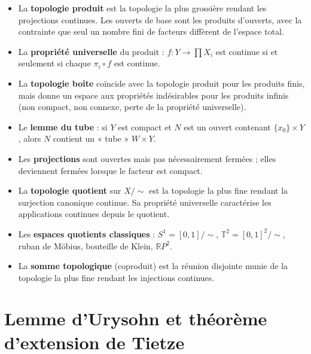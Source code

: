 \documentclass[12pt,a4paper,openany]{book}
\theoremstyle{definition}
\theoremstyle{cours}
\theoremstyle{coursnormal}
\begin{document}
\begin{itemize}
  \item La \textbf{topologie produit} est la topologie la plus grossière rendant les
        projections continues. Les ouverts de base sont les produits d'ouverts, avec
        la contrainte que seul un nombre fini de facteurs diffèrent de l'espace total.
  \item La \textbf{propriété universelle} du produit : $f \colon Y \to \prod X_i$ est
        continue si et seulement si chaque $\pi_i \circ f$ est continue.
  \item La \textbf{topologie boîte} coïncide avec la topologie produit pour les
        produits finis, mais donne un espace aux propriétés indésirables pour les
        produits infinis (non compact, non connexe, perte de la propriété universelle).
  \item Le \textbf{lemme du tube} : si $Y$ est compact et $N$ est un ouvert contenant
        $\{x_0\} \times Y$, alors $N$ contient un « tube » $W \times Y$.
  \item Les \textbf{projections} sont ouvertes mais pas nécessairement fermées ;
        elles deviennent fermées lorsque le facteur est compact.
  \item La \textbf{topologie quotient} sur $X/{\sim}$ est la topologie la plus fine
        rendant la surjection canonique continue. Sa propriété universelle caractérise
        les applications continues depuis le quotient.
  \item Les \textbf{espaces quotients classiques} : $S^1 = [0,1]/{\sim}$,
        $\mathbb{T}^2 = [0,1]^2/{\sim}$, ruban de Möbius, bouteille de Klein,
        $\mathbb{R}P^2$.
  \item La \textbf{somme topologique} (coproduit) est la réunion disjointe munie de
        la topologie la plus fine rendant les injections continues.
\end{itemize}

\chapter{Lemme d'Urysohn et théorème d'extension de Tietze}
\label{chap:urysohn-tietze}
\end{document}
